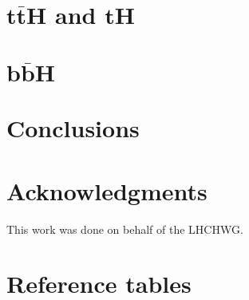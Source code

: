 \documentclass[11pt]{article}
\begin{document}
\section{$\boldsymbol{t\bar{t}H}$ and $\boldsymbol{tH}$}
\label{sec:ttH}


\section{$\boldsymbol{b\bar{b}H}$}
\label{sec:bbH}


\section{Conclusions}
\label{sec:conclusions}


\section*{Acknowledgments}
This work was done on behalf of the LHCHWG.
\newpage
\appendix
\section{Reference tables}
\label{app:tables}



\end{document}
